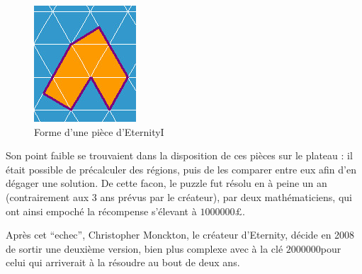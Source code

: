 \begin{figure}[H]
		\includegraphics[width=\linewidth]{images/eternity_1_piece.jpg}
		\caption{Forme d'une pièce d'EternityI}\label{fig:eternity_1_piece}
		\endminipage\hfill
	\end{figure}

	Son point faible se trouvaient dans la disposition de ces pièces sur le plateau : il était possible de précalculer des régions, puis de les comparer entre eux afin d'en dégager une solution.
	De cette facon, le puzzle fut résolu en à peine un an (contrairement aux 3 ans prévus par le créateur), par deux mathématiciens, qui ont ainsi empoché la récompense s'élevant à $1000000\pounds$.
	
	Après cet \enquote{echec}, Christopher Monckton, le créateur d'Eternity, décide en 2008 de sortir une deuxième version, bien plus complexe avec à la clé $2000000$\textdollar pour celui qui arriverait à la résoudre au bout de deux ans.
	
